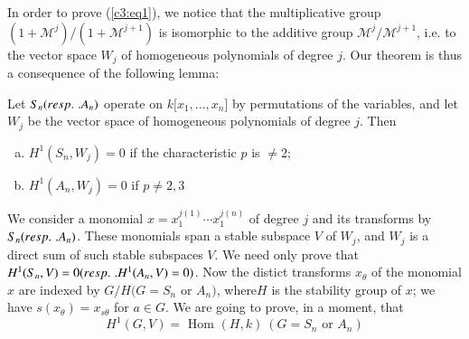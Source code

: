       In order to prove (\ref{c3:eq1}), we notice that the multiplicative group
      $(1+ \mathscr{M}^j) \big/ (1+ \mathscr{M}^{j+1})$ is isomorphic
      to the additive group $\mathscr{M}^j \big / \mathscr{M}^{j +1}$,
      i.e. to the vector space $W_j$ of homogeneous polynomials of
      degree $j$. Our theorem is thus a consequence of the following
      lemma: 
      
      \setcounter{lem}{0}
      \begin{lem}\label{app:lem1}%
Let $S_n ({resp.}\kern.3em . A_n)$ operate on $k \big [x_1, \ldots , x_n
    \big]$ by permutations of the variables, and let $W_j$ be the
  vector space of homogeneous polynomials of degree $j$. Then  
\begin{enumerate} [a)]
\item $H^1 (S_n, W_j) = 0 $ if the characteristic $p$ is $\neq
  2$; 

\item $H^1 (A_n, W_j) = 0$ if $p \neq 2, 3$
\end{enumerate}
       \end{lem}       
       
       We consider a monomial $x = x^{j(1)}_1 \cdots x^{j (n)}_1$ of
       degree $j$ and its transforms by $S_n ({resp.}\kern.3em. A_n)$. These
       monomials span a stable subspace $V$ of $W_j$, and $W_j$ is a
       direct sum of such stable subspaces $V$. We need only prove
       that $H^1 (S_n, V) = 0 ({resp.}\kern.3em. H^1 (A_n, V) = 0)$. Now the
       distict transforms $x_{\theta}$ of the monomial $x$ are indexed by $G/H
       (G = S_n $ or $A_n)$, where\pageoriginale $H$ is the stability
       group of $x$; we have $s(x_\theta) = x_{s \theta}$ for $a \in
       G$. We are going to prove, in a moment, that  
       \begin{equation*}
H^1 (G, V) = \text{ Hom } (H, k) ~ (G = S_n \text { or } A_n)
\tag{2}\label{c3:eq2} 
        \end{equation*}        
        
